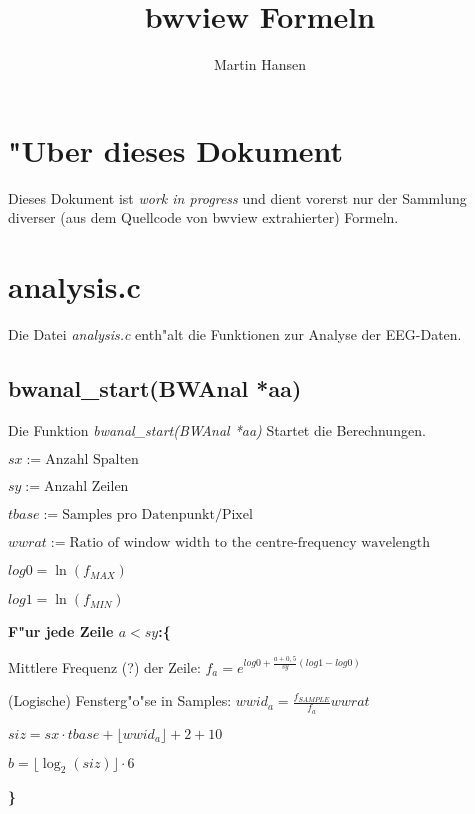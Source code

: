 \documentclass[12pt]{amsart}
\title{bwview Formeln}
\author{Martin Hansen}
\begin{document}

\renewcommand{\baselinestretch}{1.50}\normalsize

\section{"Uber dieses Dokument}

Dieses Dokument ist \emph{work in progress} und dient vorerst nur der Sammlung diverser (aus dem Quellcode von bwview extrahierter) Formeln.

\section{analysis.c}

Die Datei \emph{analysis.c} enth"alt die Funktionen zur Analyse der EEG-Daten.

\subsection{bwanal\_start(BWAnal *aa)} Die Funktion \emph{bwanal\_start(BWAnal *aa)} Startet die Berechnungen.

$sx:= \text{Anzahl Spalten}$

$sy:= \text{Anzahl Zeilen}$

$tbase:= \text{Samples pro Datenpunkt/Pixel}$

$wwrat:= \text{Ratio of window width to the centre-frequency wavelength}$

$log0 = \ln(f_{MAX})$

$log1 = \ln(f_{MIN})$

\textbf{F"ur jede Zeile $a<sy$:\{}

Mittlere Frequenz (?) der Zeile: $f_a= e^{log0 + \frac{a+0,5}{sy} \left(log1-log0\right)}$

(Logische) Fensterg"o"se in Samples: $wwid_a= \frac{f_{SAMPLE}}{f_a} wwrat $

$siz= sx\cdot tbase + \lfloor wwid_a \rfloor + 2 + 10$

$b= \lfloor \log_2\left(siz\right)\rfloor \cdot 6$

\textbf{\}}
\end{document}
